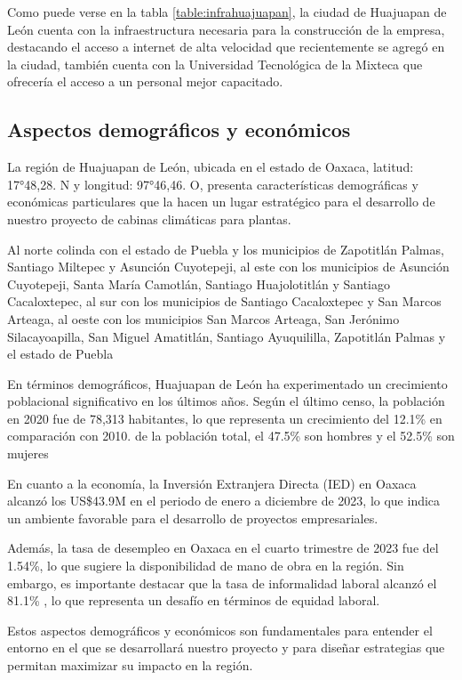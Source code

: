 Como puede verse en la tabla \ref{table:infrahuajuapan}, la ciudad de Huajuapan de León cuenta con la infraestructura necesaria para la construcción de la empresa, destacando el acceso a internet de alta velocidad que recientemente se agregó en la ciudad, también cuenta con la Universidad Tecnológica de la Mixteca que ofrecería el acceso a un personal mejor capacitado. 

\subsection{Aspectos demográficos y económicos}
La región de Huajuapan de León, ubicada en el estado de Oaxaca, latitud: 17°48,28. N 
y longitud: 97°46,46. O, presenta características demográficas y económicas particulares que la hacen un lugar estratégico para el desarrollo de nuestro proyecto de cabinas climáticas para plantas.

Al norte colinda con el estado de Puebla y los municipios de Zapotitlán Palmas, Santiago Miltepec y Asunción Cuyotepeji, al este con los municipios de Asunción Cuyotepeji, Santa María Camotlán, Santiago Huajolotitlán y Santiago Cacaloxtepec, al sur con los municipios de Santiago Cacaloxtepec y San Marcos Arteaga, al oeste con los municipios San Marcos Arteaga, San Jerónimo Silacayoapilla, San Miguel Amatitlán, Santiago Ayuquililla, Zapotitlán Palmas y el estado de Puebla

En términos demográficos, Huajuapan de León ha experimentado un crecimiento poblacional significativo en los últimos años. Según el último censo, la población en 2020 fue de 78,313 habitantes, lo que representa un crecimiento del 12.1\% \cite{PoblacionHuajuapan2020} en comparación con 2010. de la población total, el 47.5\% son hombres y el 52.5\% son mujeres

En cuanto a la economía, la Inversión Extranjera Directa (IED) en Oaxaca alcanzó los US\$43.9M en el periodo de enero a diciembre de 2023, lo que indica un ambiente favorable para el desarrollo de proyectos empresariales.

Además, la tasa de desempleo en Oaxaca en el cuarto trimestre de 2023 fue del 1.54\%, lo que sugiere la disponibilidad de mano de obra en la región. Sin embargo, es importante destacar que la tasa de informalidad laboral alcanzó el 81.1\% \cite{DataMexicoHuajuapan2023}, lo que representa un desafío en términos de equidad laboral.

Estos aspectos demográficos y económicos son fundamentales para entender el entorno en el que se desarrollará nuestro proyecto y para diseñar estrategias que permitan maximizar su impacto en la región.

